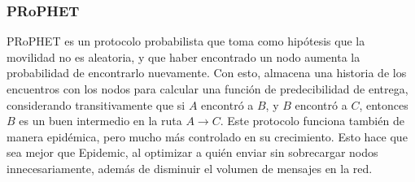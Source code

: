 \subsubsection{PRoPHET}
PRoPHET\cite{prophet} es un protocolo probabilista que toma como hipótesis que la movilidad no es aleatoria, y que haber encontrado un nodo aumenta la probabilidad de encontrarlo nuevamente. Con esto,  almacena una historia de los encuentros con los nodos para calcular una función de predecibilidad de entrega, considerando transitivamente que si $A$ encontró a $B$, y $B$ encontró a $C$, entonces $B$ es un buen intermedio en la ruta $A\rightarrow C$. Este protocolo funciona también de manera epidémica, pero mucho más controlado en su crecimiento. Esto hace que sea mejor que Epidemic, al optimizar a quién enviar sin sobrecargar nodos innecesariamente, además de disminuir el volumen de mensajes en la red.